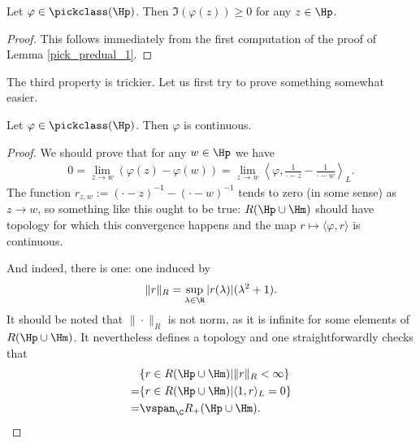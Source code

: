 \begin{lem}
	Let $\varphi \in \pickclass(\Hp)$. Then $\Im(\varphi(z)) \geq 0$ for any $z \in \Hp$.
\end{lem}
\begin{proof}
	This follows immediately from the first computation of the proof of Lemma \ref{pick_predual_1}.
\end{proof}

The third property is trickier. Let us first try to prove something somewhat easier.

\begin{prop}
	Let $\varphi \in \pickclass(\Hp)$. Then $\varphi$ is continuous.
\end{prop}
\begin{proof}
	We should prove that for any $w \in \Hp$ we have
	\begin{align*}
		0 = \lim_{z \to w}\left(\varphi(z) - \varphi(w)\right) = \lim_{z \to w} \left\langle \varphi, \frac{1}{\cdot - z} - \frac{1}{\cdot - w}\right\rangle_{L}.
	\end{align*}
	The function $r_{z, w} := (\cdot - z)^{-1} - (\cdot - w)^{-1}$ tends to zero (in some sense) as $z \to w$, so something like this ought to be true: $R(\Hp \cup \Hm)$ should have topology for which this convergence happens and the map $r \mapsto \langle \varphi, r\rangle$ is continuous.

	And indeed, there is one: one induced by
	\begin{align*}
		\|r\|_{R} = \sup_{\lambda \in \R} |r(\lambda)| (\lambda^2 + 1).
	\end{align*}
	It should be noted that $\|\cdot\|_{R}$ is not norm, as it is infinite for some elements of $R(\Hp \cup \Hm)$. It nevertheless defines a topology and one straightforwardly checks that
	\begin{align*}
		&\{r \in R(\Hp \cup \Hm) | \|r\|_{R} < \infty\} \\
		=& \{r \in R(\Hp \cup \Hm) | \langle 1, r \rangle_{L} = 0 \} \\
		=& \vspan_{\C} R_{+}(\Hp \cup \Hm).
	\end{align*}


\end{proof}
